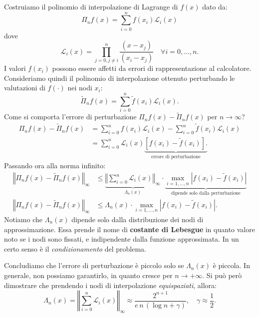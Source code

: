 Costruiamo il polinomio di interpolazione di Lagrange di $f(x)$ dato da:
\begin{equation*}
\Pi _{n} f(x) =\sum ^{n}_{i=0} f( x_{i})\mathcal{L}_{i}(x)
\end{equation*}
dove
\begin{equation*}
\mathcal{L}_{i}(x) =\prod ^{n}_{j=0,j\neq i}\frac{( x-x_{j})}{( x_{i} -x_{j})} \quad\forall i=0,\dotsc ,n.
\end{equation*}
I valori $f( x_{i})$ possono essere affetti da errori di rappresentazione al calcolatore. Consideriamo quindi il polinomio di interpolazione ottenuto perturbando le valutazioni di $f( \cdot )$ nei nodi $x_{i}$:
\begin{equation*}
\tilde{\Pi }_{n} f(x) =\sum ^{n}_{i=0}\tilde{f}( x_{i})\mathcal{L}_{i}(x).
\end{equation*}
Come si comporta l'errore di perturbazione $\Pi _{n} f(x) -\tilde{\Pi }_{n} f(x)$ per $n\rightarrow \infty $?
\begin{align*}
\Pi _{n} f(x) -\tilde{\Pi }_{n} f(x) & =\sum ^{n}_{i=0} f( x_{i})\mathcal{L}_{i}(x) -\sum ^{n}_{i=0}\tilde{f}( x_{i})\mathcal{L}_{i}(x)\\
 & =\sum ^{n}_{i=0}\mathcal{L}_{i}(x)\underbrace{\left[ f( x_{i}) -\tilde{f}( x_{i})\right].}_{\text{errore di perturbazione}}
\end{align*}
Passando ora alla norma infinito:
\begin{align*}
\left\Vert \Pi _{n} f(x) -\tilde{\Pi }_{n} f(x)\right\Vert _{\infty } & \leqslant \underbrace{\left\Vert \sum ^{n}_{i=0}\mathcal{L}_{i}(x)\right\Vert _{\infty }}_{\Lambda _{n}(x)} \cdot \underbrace{\max_{i=1,\dotsc ,n}\left| f( x_{i}) -\tilde{f}( x_{i})\right| }_{\text{dipende solo dalla perturbazione}}\\
\left\Vert \Pi _{n} f(x) -\tilde{\Pi }_{n} f(x)\right\Vert _{\infty } & \leqslant \Lambda _{n}(x) \cdot \max_{i=1,\dotsc ,n}\left| f( x_{i}) -\tilde{f}( x_{i})\right| .
\end{align*}
Notiamo che $\Lambda_{n}(x)$ dipende solo dalla distribuzione dei nodi di approssimazione.
Essa prende il nome di \textbf{costante di Lebesgue} in quanto valore noto se i nodi sono fissati, e indipendente dalla funzione approssimata. In un certo senso è il \textit{condizionamento} del problema.

Concludiamo che l'errore di perturbazione è piccolo solo se $\Lambda_{n}(x)$ è piccola. In generale, non possiamo garantirlo, in quanto cresce per $n\rightarrow +\infty $. Si può però dimostrare che prendendo i nodi di interpolazione \textit{equispaziati}, allora:
\begin{equation*}
\Lambda _{n}(x) =\left\Vert \sum ^{n}_{i=0}\mathcal{L}_{i}(x)\right\Vert _{\infty } \approx \frac{2^{n+1}}{e\, n\, (\log n+\gamma )} ,\quad\gamma \approx \frac{1}{2} .
\end{equation*}

